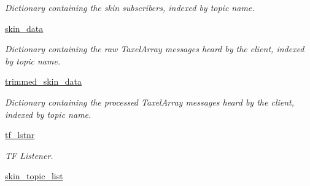\begin{DoxyCompactItemize}
\begin{DoxyCompactList}\small\item\em \-Dictionary containing the skin subscribers, indexed by topic name. \end{DoxyCompactList}\item 
\hypertarget{classhrl__haptic__mpc_1_1skin__client_1_1_taxel_array_client_a0978230e7e71172f151e6a94ed0d8e32}{\hyperlink{classhrl__haptic__mpc_1_1skin__client_1_1_taxel_array_client_a0978230e7e71172f151e6a94ed0d8e32}{skin\-\_\-data}}\label{classhrl__haptic__mpc_1_1skin__client_1_1_taxel_array_client_a0978230e7e71172f151e6a94ed0d8e32}

\begin{DoxyCompactList}\small\item\em \-Dictionary containing the raw \-Taxel\-Array messages heard by the client, indexed by topic name. \end{DoxyCompactList}\item 
\hypertarget{classhrl__haptic__mpc_1_1skin__client_1_1_taxel_array_client_a7eb603c612cfd170db4886a31666ac75}{\hyperlink{classhrl__haptic__mpc_1_1skin__client_1_1_taxel_array_client_a7eb603c612cfd170db4886a31666ac75}{trimmed\-\_\-skin\-\_\-data}}\label{classhrl__haptic__mpc_1_1skin__client_1_1_taxel_array_client_a7eb603c612cfd170db4886a31666ac75}

\begin{DoxyCompactList}\small\item\em \-Dictionary containing the processed \-Taxel\-Array messages heard by the client, indexed by topic name. \end{DoxyCompactList}\item 
\hypertarget{classhrl__haptic__mpc_1_1skin__client_1_1_taxel_array_client_a6d9e3066be02665439a0b966722ae69b}{\hyperlink{classhrl__haptic__mpc_1_1skin__client_1_1_taxel_array_client_a6d9e3066be02665439a0b966722ae69b}{tf\-\_\-lstnr}}\label{classhrl__haptic__mpc_1_1skin__client_1_1_taxel_array_client_a6d9e3066be02665439a0b966722ae69b}

\begin{DoxyCompactList}\small\item\em \-T\-F \-Listener. \end{DoxyCompactList}\item 
\hypertarget{classhrl__haptic__mpc_1_1skin__client_1_1_taxel_array_client_a8389477cf4f2e630fe73c99c7b79386e}{\hyperlink{classhrl__haptic__mpc_1_1skin__client_1_1_taxel_array_client_a8389477cf4f2e630fe73c99c7b79386e}{skin\-\_\-topic\-\_\-list}}\label{classhrl__haptic__mpc_1_1skin__client_1_1_taxel_array_client_a8389477cf4f2e630fe73c99c7b79386e}


\end{DoxyCompactItemize}
